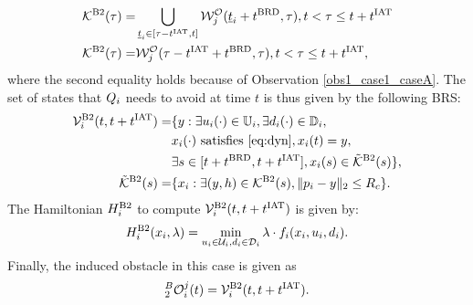 \begin{itemize}[leftmargin=*]
\begin{equation} \label{eqn:obs_case2_caseB_help2}
\begin{aligned}
\mathcal{K}^{\text{B2}}(\tau) = & \bigcup_{\tsa_i \in [\tau-\iat, t]} \frs_{j}^{\mathcal{O}}(\tsa_i + \brd, \tau), t < \tau \leq t + \iat\\
\mathcal{K}^{\text{B2}}(\tau) = & \frs_{j}^{\mathcal{O}}(\tau-\iat+\brd, \tau), t < \tau \leq t + \iat,
\end{aligned}
\end{equation}
where the second equality holds because of Observation \ref{obs1_case1_caseA}. The set of states that $Q_i$ needs to avoid at time $t$ is thus given by the following BRS:  
\begin{equation} \label{eq:ObsBRS_case2_caseB}
\begin{aligned}
\brs^{\text{B2}}_{i}(t, t+\iat) = & \{y: \exists \ctrl_i(\cdot) \in \cfset_i, \exists \dstb_i(\cdot) \in \dfset_i, \\
& \state_i(\cdot) \text{ satisfies \eqref{eq:dyn}}, \state_i(t) = y, \\
& \exists s \in [t+\brd, t+\iat], \state_i(s) \in \tilde{\mathcal{K}}^{\text{B2}}(s) \},\\
\tilde{\mathcal{K}}^{\text{B2}}(s) = & \{\state_i: \exists (y, h) \in \mathcal{K}^{\text{B2}}(s), \|\pos_i - y\|_2 \le \rc \}.
\end{aligned}
\end{equation}
The Hamiltonian $H^{\text{B2}}_{i}$ to compute $\mathcal{V}^{\text{B2}}_{i}(t, t+t^\text{IAT})$ is given by:
\begin{equation} \label{eqn:BRS_obsham_case2_caseB}
\ham^{\text{B2}}_{i}(\state_i, \costate) = \min_{\ctrl_i \in \cset_i, \dstb_i \in \dset_i} \costate \cdot f_i (\state_i, \ctrl_i, \dstb_i).
\end{equation}
Finally, the induced obstacle in this case is given as
\begin{equation} \label{eq:intruderObs_case2_caseB}
_2^B\ioset_i^j(t) = \brs^{\text{B2}}_{i}(t, t+\iat).
\end{equation}
\end{itemize}